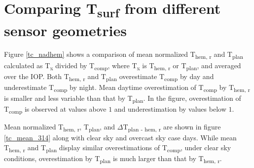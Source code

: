 %
%






\section{Comparing T\textsubscript{surf} from different sensor geometries}


 

Figure \ref{tc_nadhem} shows a comparison of mean normalized T\textsubscript{hem, r} and T\textsubscript{plan} calculated as T\textsubscript{x} divided by T\textsubscript{comp}, where T\textsubscript{x} is T\textsubscript{hem, r} or T\textsubscript{plan}, and averaged over the IOP. Both T\textsubscript{hem, r} and T\textsubscript{plan} overestimate T\textsubscript{comp} by day and underestimate T\textsubscript{comp} by night. Mean daytime overestimation of T\textsubscript{comp} by T\textsubscript{hem, r} is smaller and less variable than that by T\textsubscript{plan}. In the figure, overestimation of T\textsubscript{comp} is observed at values above $1$ and underestimation by values below $1$.

Mean normalized T\textsubscript{hem, r}, T\textsubscript{plan}, and $\Delta$T\textsubscript{plan - hem, r} are shown in figure \ref{tc_mean_314} along with clear sky and overcast sky case days. While mean T\textsubscript{hem, r} and T\textsubscript{plan} display similar overestimations of T\textsubscript{comp}, under clear sky conditions, overestimation by T\textsubscript{plan} is much larger than that by T\textsubscript{hem, r}.

